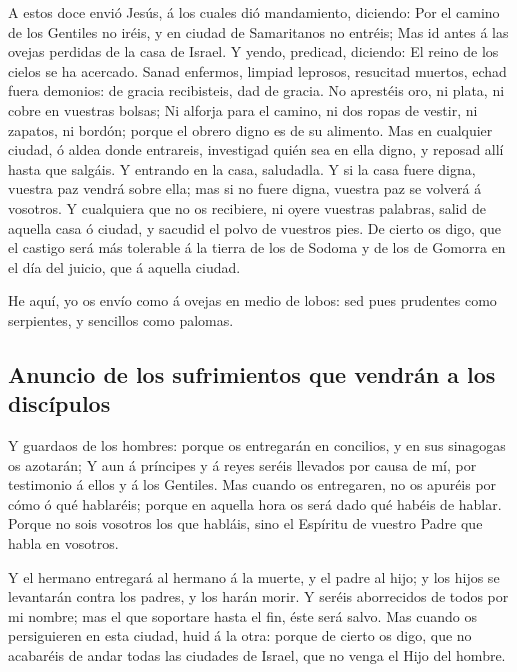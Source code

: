  A estos doce envió Jesús, á los cuales dió mandamiento,
diciendo: Por el camino de los Gentiles no iréis, y en ciudad de
Samaritanos no entréis;  Mas id antes á las ovejas
perdidas de la casa de Israel.  Y yendo, predicad,
diciendo: El reino de los cielos se ha acercado.  Sanad
enfermos, limpiad leprosos, resucitad muertos, echad fuera demonios: de
gracia recibisteis, dad de gracia.  No aprestéis oro, ni
plata, ni cobre en vuestras bolsas;  Ni alforja para el
camino, ni dos ropas de vestir, ni zapatos, ni bordón; porque el obrero
digno es de su alimento.  Mas en cualquier ciudad, ó
aldea donde entrareis, investigad quién sea en ella digno, y reposad
allí hasta que salgáis.  Y entrando en la casa,
saludadla.  Y si la casa fuere digna, vuestra paz vendrá
sobre ella; mas si no fuere digna, vuestra paz se volverá á vosotros.
 Y cualquiera que no os recibiere, ni oyere vuestras
palabras, salid de aquella casa ó ciudad, y sacudid el polvo de vuestros
pies.  De cierto os digo, que el castigo será más
tolerable á la tierra de los de Sodoma y de los de Gomorra en el día del
juicio, que á aquella ciudad.

 He aquí, yo os envío como á ovejas en medio de lobos:
sed pues prudentes como serpientes, y sencillos como palomas.

\hypertarget{anuncio-de-los-sufrimientos-que-vendruxe1n-a-los-discuxedpulos}{%
\subsection{Anuncio de los sufrimientos que vendrán a los
discípulos}\label{anuncio-de-los-sufrimientos-que-vendruxe1n-a-los-discuxedpulos}}

 Y guardaos de los hombres: porque os entregarán en
concilios, y en sus sinagogas os azotarán;  Y aun á
príncipes y á reyes seréis llevados por causa de mí, por testimonio á
ellos y á los Gentiles.  Mas cuando os entregaren, no os
apuréis por cómo ó qué hablaréis; porque en aquella hora os será dado
qué habéis de hablar.  Porque no sois vosotros los que
habláis, sino el Espíritu de vuestro Padre que habla en vosotros.

 Y el hermano entregará al hermano á la muerte, y el
padre al hijo; y los hijos se levantarán contra los padres, y los harán
morir.  Y seréis aborrecidos de todos por mi nombre; mas
el que soportare hasta el fin, éste será salvo.  Mas
cuando os persiguieren en esta ciudad, huid á la otra: porque de cierto
os digo, que no acabaréis de andar todas las ciudades de Israel, que no
venga el Hijo del hombre.

